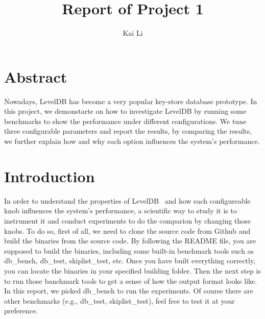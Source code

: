 \documentclass[letter,twocolumn,10pt]{article}
\begin{document}
\date{}

\title{\Large \textbf{Report of Project 1}}
\author{Kai Li}
\maketitle

\section*{Abstract}
Nowadays, LevelDB has become a very popular key-store database prototype. In this project, we demonstarte on how to investigate LevelDB by running some benchmarks to show the performance under different configurations. We tune three configurable parameters and report the results, by comparing the results, we further explain how and why each option influences the system's performance.
\section{Introduction}
In order to understand the properties of LevelDB~\cite{leveldb} and how each configureable knob influences the system's performance, a scientific way to study it is to instrument it and conduct experiments to do the comparion by changing those knobs. To do so, first of all, we need to clone the source code from Github and build the binaries from the source code. By following the README file, you are supposed to build the binaries, including some built-in benchmark tools such as \textsf{db\_bench}, \textsf{db\_test}, \textsf{skiplist\_test}, etc. Once you have built everything correctly, you can locate the binaries in your specified building folder. Then the next step is to run those banchmark tools to get a sense of how the output format looks like. In this report, we picked \textsf{db\_bench} to run the experiments. Of course there are other benchmarks (e.g., db\_test, skiplist\_test), feel free to test it at your preference. 
\end{document}
